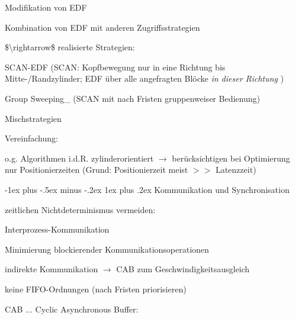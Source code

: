 \documentclass[a4paper]{article}
\makeatletter
\renewcommand{\subsubsection}{\@startsection{subsubsection}{3}{0mm}%
 {-1ex plus -.5ex minus -.2ex}%
 {1ex plus .2ex}%
 {\normalfont\small\bfseries}}
\makeatother
\begin{document}
\begin{multicols}{3}
\begin{itemize*}
\begin{enumerate*}
            \item Modifikation von EDF
            \item Kombination von EDF mit anderen Zugriffsstrategien
        \end{enumerate*}
    \end{itemize*}

    \$\textbackslash rightarrow\$ realisierte Strategien:

    \begin{enumerate*}
        \item
        SCAN-EDF (SCAN: Kopfbewegung nur in eine Richtung bis
        Mitte-/Randzylinder; EDF über alle angefragten Blöcke \emph{in dieser
            Richtung} )
        \item
        Group Sweeping\_ (SCAN mit nach Fristen gruppenweiser Bedienung)
        \item
        Mischstrategien
    \end{enumerate*}

    \begin{itemize*}
        \item
        Vereinfachung:
        \begin{itemize*}
            \item o.g. Algorithmen i.d.R. zylinderorientiert $\rightarrow$  berücksichtigen bei Optimierung nur Positionierzeiten (Grund: Positionierzeit meist $>>$ Latenzzeit)
        \end{itemize*}
    \end{itemize*}


    \subsubsection{Kommunikation und
        Synchronisation}

    \begin{itemize*}
        \item
        zeitlichen Nichtdeterminismus vermeiden:
        \begin{enumerate*}

            \item Interprozess-Kommunikation
        \end{enumerate*}
        \begin{itemize*}
            \item Minimierung blockierender Kommunikationsoperationen
            \item indirekte Kommunikation $\rightarrow$  CAB zum Geschwindigkeitsausgleich
            \item keine FIFO-Ordnungen (nach Fristen priorisieren)
            \item CAB ... Cyclic Asynchronous Buffer: %
        \end{itemize*}
        \begin{enumerate*}


\end{enumerate*}
\end{itemize*}
\end{multicols}
\end{document}
